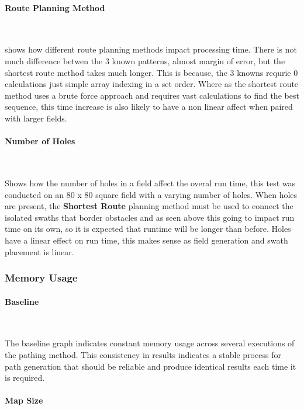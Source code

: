 \documentclass[final]{cmpreport_02}
\begin{document}
\paragraph{Route Planning Method} \

 shows how different route planning methods impact processing time.
There is not much difference betwen the 3 known patterns, almost margin of error, but the shortest route method takes much longer.
This is because, the 3 knowns requrie 0 calculations just simple array indexing in a set order.
Where as the shortest route method uses a brute force approach and requires vast calculations to find the best sequence, this time increase is also likely to have a non linear affect when paired with larger fields.

\paragraph{Number of Holes} \

 Shows how the number of holes in a field affect the overal run time, this test was conducted on an 80 x 80 square field with a varying number of holes.
When holes are present, the \textbf{Shortest Route} planning method must be used to connect the isolated swaths that border obstacles and as seen above this going to impact run time on its own, so it is expected that runtime will be longer than before.
Holes have a linear effect on run time, this makes sense as field generation and swath placement is linear.


\subsubsection{Memory Usage}

\paragraph{Baseline} \

The baseline graph  indicates constant memory usage across several executions of the pathing method.
This consistency in results indicates a stable process for path generation that should be reliable and produce identical results each time it is required.

\paragraph{Map Size} \
\end{document}
